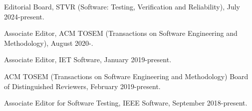 \documentclass[ComputerScience]{vita}
\begin{document}
\begin{vita}
\begin{Professional Activities and Service}
 \item Editorial Board, STVR (Software: Testing, Verification and
   Reliability), 
    July 2024-present.
  
  \item Associate Editor, ACM TOSEM (Transactions on Software Engineering and
    Methodology), 
    August 2020-.
  
  \item Associate Editor, IET Software, 
    January 2019-present.

  \item ACM TOSEM (Transactions on Software Engineering and
    Methodology) Board of Distinguished Reviewers, February 2019-present.
  
  \item Associate Editor for Software Testing, IEEE Software,
    September 2018-present.


\end{Professional Activities and Service}
\end{vita}
\end{document}
